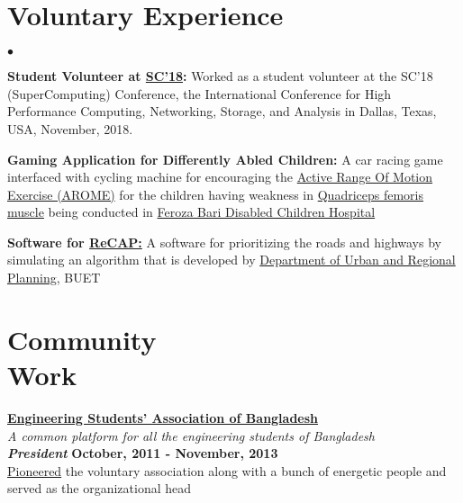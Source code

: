 \documentclass[margin,line]{res}
\newenvironment{list2}{
  \begin{list}{$\bullet$}{%
      \setlength{\itemsep}{0in}
      \setlength{\parsep}{0in} \setlength{\parskip}{0in}
      \setlength{\topsep}{0in} \setlength{\partopsep}{0in} 
      \setlength{\leftmargin}{0.2in}}}{\end{list}}
\begin{document}
\begin{resume}
\section{\sc Voluntary Experience}
\begin{list2}
\item {\bf {Student Volunteer at \href{https://sc18.supercomputing.org/}{SC'18}:}} Worked as a student volunteer at the SC'18 (SuperComputing) Conference, the International Conference for High Performance Computing, Networking, Storage, and Analysis in Dallas, Texas, USA, November, 2018.
\item {\bf {Gaming Application for Differently Abled Children:}} A car racing game interfaced with cycling machine for encouraging the \href{http://www.physiotherapynotes.com/2011/07/physiotherapy-exercises-types.html}{Active Range Of Motion Exercise (AROME)} for the children having weakness in \href{https://en.wikipedia.org/wiki/Quadriceps_femoris_muscle}{Quadriceps femoris muscle} being conducted in \href{http://www.bccw-bd.org/information_about.html}{Feroza Bari Disabled Children Hospital}
\item {\bf Software for \href{http://www.research4cap.org/SitePages/Home.aspx}{ReCAP:}} A software for prioritizing the roads and highways by simulating an algorithm that is developed by \href{http://urp.buet.ac.bd/}{Department of Urban and Regional Planning}, BUET
\end{list2}

\vspace*{-.1in}

\section{\sc Community \\Work}
{\bf \href{http://www.esab.org.bd/}{Engineering Students' Association of Bangladesh}} \\
\textit{A common platform for all the engineering students of Bangladesh \\}
\textbf{{\em President}} \hfill {\bf October, 2011 - November, 2013}\\
\href{https://www.youtube.com/watch?v=2GRKcrF47gM}{Pioneered} the voluntary association along with a bunch of energetic people and served as the organizational head

\vspace*{-.1in}


\end{resume}
\end{document}
